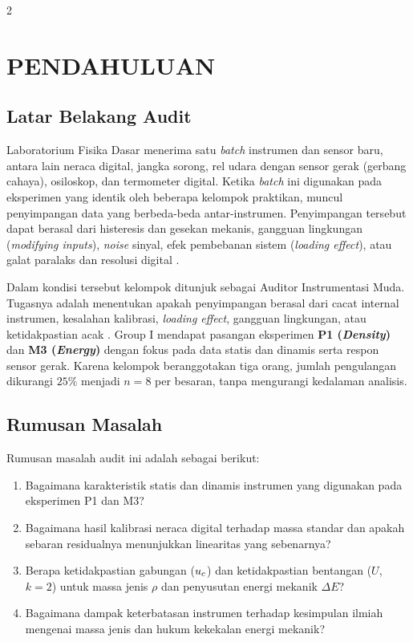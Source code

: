 \documentclass[a4paper, 12pt]{article}
\begin{document}
    
    

\newpage
\begin{multicols}{2}
    \raggedcolumns
    \section{PENDAHULUAN}
        \subsection{Latar Belakang Audit}
        Laboratorium Fisika Dasar menerima satu \textit{batch} instrumen dan sensor baru, antara lain neraca digital, jangka sorong, rel udara dengan sensor gerak (gerbang cahaya), osiloskop, dan termometer digital. Ketika \textit{batch} ini digunakan pada eksperimen yang identik oleh beberapa kelompok praktikan, muncul penyimpangan data yang berbeda-beda antar-instrumen. Penyimpangan tersebut dapat berasal dari histeresis dan gesekan mekanis, gangguan lingkungan (\textit{modifying inputs}), \textit{noise} sinyal, efek pembebanan sistem (\textit{loading effect}), atau galat paralaks dan resolusi digital \parencite{Bentley2005}.

        Dalam kondisi tersebut kelompok ditunjuk sebagai Auditor Instrumentasi Muda. Tugasnya adalah menentukan apakah penyimpangan berasal dari cacat internal instrumen, kesalahan kalibrasi, \textit{loading effect}, gangguan lingkungan, atau ketidakpastian acak \parencite{WinarnoYhuwana}. Group I mendapat pasangan eksperimen \textbf{P1 (\textit{Density})} dan \textbf{M3 (\textit{Energy})} dengan fokus pada data statis dan dinamis serta respon sensor gerak. Karena kelompok beranggotakan tiga orang, jumlah pengulangan dikurangi $25\%$ menjadi $n=8$ per besaran, tanpa mengurangi kedalaman analisis.

        \subsection{Rumusan Masalah}
        Rumusan masalah audit ini adalah sebagai berikut:
        \begin{enumerate}
            \item Bagaimana karakteristik statis dan dinamis instrumen yang digunakan pada eksperimen P1 dan M3?
            \item Bagaimana hasil kalibrasi neraca digital terhadap massa standar dan apakah sebaran residualnya menunjukkan linearitas yang sebenarnya?
            \item Berapa ketidakpastian gabungan ($u_{c}$) dan ketidakpastian bentangan ($U$, $k=2$) untuk massa jenis $\rho$ dan penyusutan energi mekanik $\Delta E$?
            \item Bagaimana dampak keterbatasan instrumen terhadap kesimpulan ilmiah mengenai massa jenis dan hukum kekekalan energi mekanik?
        \end{enumerate}


\end{multicols}
\end{document}
